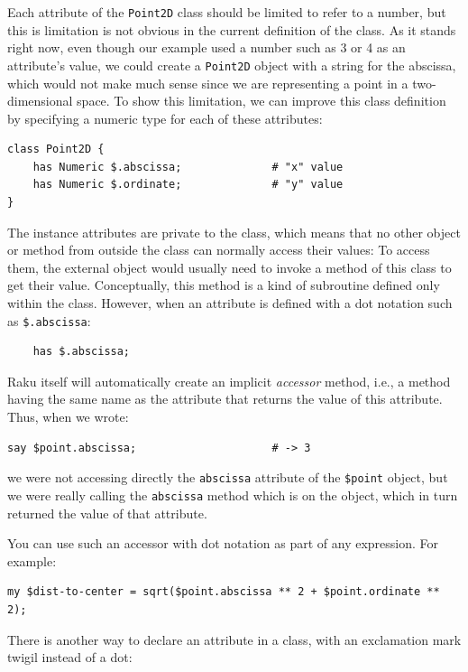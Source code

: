 Each attribute of the {\tt Point2D} class should be limited to refer to a 
number, but this is limitation is not obvious in the current definition of 
the class. As it stands right now, even though our example used a number
such as 3 or 4 as an attribute's value, we could create a {\tt Point2D} 
object with a string for the abscissa, which would not make 
much sense since we are representing a point in a two-dimensional space.
To show this limitation, we can improve this class definition by specifying 
a numeric type for each of these attributes:
%
\begin{verbatim}
class Point2D {
    has Numeric $.abscissa;              # "x" value
    has Numeric $.ordinate;              # "y" value
}
\end{verbatim}
%
The instance attributes are private to the class, which means 
that no other object or method from outside the class can normally access their values: 
To access them, the external object would usually need to invoke a method of this class 
to get their value. Conceptually, this method is a kind of subroutine defined only within the class.
However, when an attribute is defined with a dot notation
such as  \verb'$.abscissa':

\begin{verbatim}
    has $.abscissa;  
\end{verbatim}
%
Raku itself will automatically create an implicit \emph{accessor} method, 
i.e., a method having the same name as the attribute that returns 
the value of this attribute. Thus, when we wrote:

\begin{verbatim}
say $point.abscissa;                     # -> 3
\end{verbatim}
%
we were not accessing directly the {\tt abscissa} attribute of 
the \verb'$point' object, but we were really calling the 
{\tt abscissa} method which is on the object, which in turn returned 
the value of that attribute.

You can use such an accessor with dot notation as part of any 
expression. For example:

\begin{verbatim}
my $dist-to-center = sqrt($point.abscissa ** 2 + $point.ordinate ** 2);
\end{verbatim}
%

There is another way to declare an attribute in a class, with 
an exclamation mark twigil instead of a dot:

